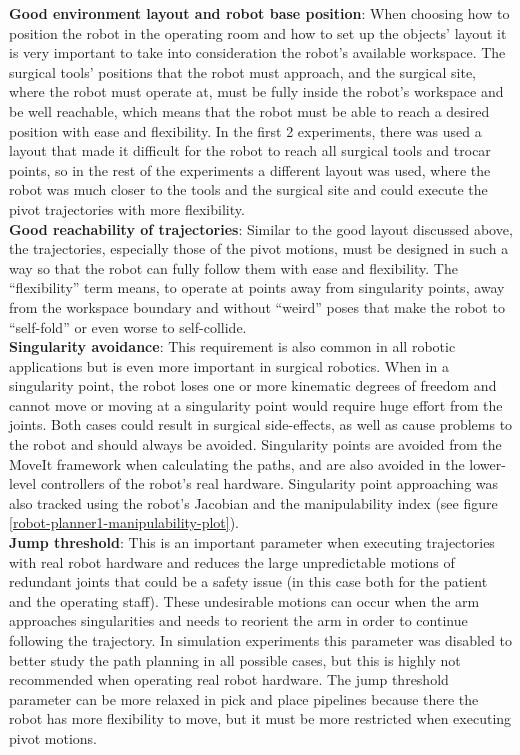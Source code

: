 \textbf{Good environment layout and robot base position}: When choosing how to position the robot in the operating room and how to set up the objects’ layout it is very important to take into consideration the robot’s available 
workspace. The surgical tools’ positions that the robot must approach, and the surgical site, where the robot must operate at, must be fully inside the robot's workspace and be well reachable, which means that the robot must 
be able to reach a desired position with ease and flexibility. In the first 2 experiments, there was used a layout that made it difficult for the robot to reach all surgical tools and trocar points, so in the rest of the 
experiments a different layout was used, where the robot was much closer to the tools and the surgical site and could execute the pivot trajectories with more flexibility.\\

\textbf{Good reachability of trajectories}: Similar to the good layout discussed above, the trajectories, especially those of the pivot motions, must be designed in such a way so that the robot can fully follow them with ease and 
flexibility. The “flexibility” term means, to operate at points away from singularity points, away from the workspace boundary and without “weird” poses that make the robot to “self-fold” or even worse to self-collide.\\

\textbf{Singularity avoidance}: This requirement is also common in all robotic applications but is even more important in surgical robotics. When in a singularity point, the robot loses one or more kinematic degrees of freedom and 
cannot move or moving at a singularity point would require huge effort from the joints. Both cases could result in surgical side-effects, as well as cause problems to the robot and should always be avoided. Singularity points 
are avoided from the MoveIt framework when calculating the paths, and are also avoided in the lower-level controllers of the robot’s real hardware. Singularity point approaching was also tracked using the robot’s Jacobian and 
the manipulability index (see figure \ref{robot-planner1-manipulability-plot}).\\

\textbf{Jump threshold}: This is an important parameter when executing trajectories with real robot hardware and reduces the large unpredictable motions of redundant joints that could be a safety issue (in this case both for the 
patient and the operating staff). These undesirable motions can occur when the arm approaches singularities and needs to reorient the arm in order to continue following the trajectory. In simulation experiments this parameter 
was disabled to better study the path planning in all possible cases, but this is highly not recommended when operating real robot hardware. The jump threshold parameter can be more relaxed in pick and place pipelines because 
there the robot has more flexibility to move, but it must be more restricted when executing pivot motions.\\

